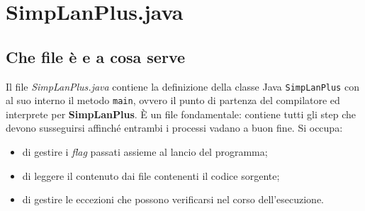 \documentclass[../report.tex]{subfiles}
\begin{document}
\chapter{SimpLanPlus.java}\label{c:simplanplus-java}

\section{Che file è e a cosa serve}\label{s:che-file-cosa-serve}
Il file \textit{SimpLanPlus.java} contiene la definizione della classe Java \verb|SimpLanPlus| con al suo interno il metodo \verb|main|, ovvero il punto di partenza del compilatore ed interprete per \textbf{SimpLanPlus}.
È un file fondamentale: contiene tutti gli step che devono susseguirsi affinché entrambi i processi vadano a buon fine.
Si occupa:
\begin{itemize}
    \item di gestire i \textit{flag} passati assieme al lancio del programma;
    \item di leggere il contenuto dai file contenenti il codice sorgente;
    \item di gestire le eccezioni che possono verificarsi nel corso dell'esecuzione.
\end{itemize}
\end{document}
